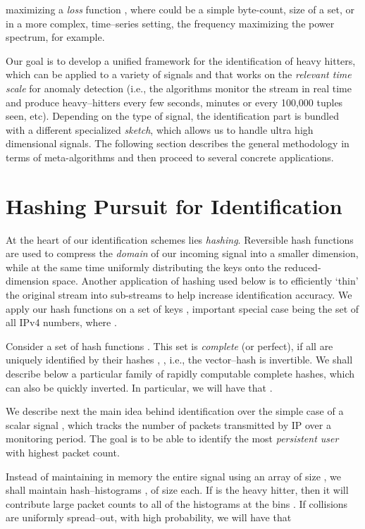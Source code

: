\documentclass[10pt, conference, letterpaper,onecolumn]{IEEEtranv1.8}
\theoremstyle{plain}\newtheorem{thm}{Theorem}\newtheorem{lem}{Lemma}
\theoremstyle{definition}
\begin{document}
maximizing a {\em loss} function , where  could be a simple byte-count, size of a set, or 
in a more complex, time--series setting, the frequency maximizing the power spectrum, for example.

Our goal is to develop a unified framework for the identification of heavy hitters, which can be applied to a variety of signals and
that works on the {\em relevant time scale} for anomaly detection (i.e., the algorithms monitor the stream in real time 
and produce heavy--hitters every few seconds, minutes or every 100,000 tuples seen, etc). 
Depending on the type of signal, the identification part is bundled with a different specialized {\em sketch}, which 
allows us to handle ultra high dimensional signals. The following section describes the general methodology in terms of
meta-algorithms and then proceed to several concrete applications. 

\section{Hashing Pursuit for Identification}
\label{sec:hash-ident}

At the heart of our identification schemes lies \emph{hashing}.  Reversible hash functions are used to compress the 
\emph{domain} of our incoming signal into a smaller dimension, while at the same time uniformly distributing the 
keys onto the reduced-dimension space. Another application of hashing used below is to efficiently `thin' the 
original stream into sub-streams to help increase identification accuracy.
We apply our hash functions on a set of keys , important 
special case being the set of all IPv4 numbers, where .


\smallskip
{}
Consider a set of 
hash functions . This set is {\em complete} (or perfect),
if all  are uniquely identified by their hashes , , i.e.,
the vector--hash  is invertible.  We shall describe below a particular family of
rapidly computable complete hashes, which can also be quickly inverted. In particular, we will have that
.



We describe next the main idea behind identification over the simple case of a scalar signal ,
which tracks the number of packets  transmitted by IP  over a monitoring period. The goal is to be able to identify
the most {\em persistent user} with highest packet count.

Instead of maintaining in memory the entire signal  using an array of size , we shall maintain  hash--histograms 
, of size  each. If  is the heavy hitter, then it will contribute large packet counts
 to all of the  histograms at the bins .
If collisions are uniformly spread--out, with high probability, we will have that
\end{document}
